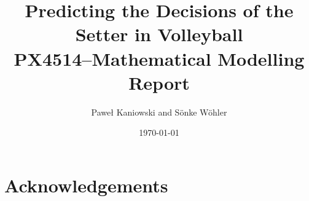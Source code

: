 \documentclass[11pt]{article}
\title{   Predicting the Decisions of the Setter in Volleyball \\
  \large PX4514--Mathematical Modelling Report
}
\author{Pawe{\l} Kaniowski and S\"onke W\"ohler}
\date{\today}
\begin{document}
  
  

  \clearpage
  
  \abstract
    \begingroup
      \fontsize{8pt}{10pt}\selectfont
    
        \lipsum[1]
    
    \endgroup
    \hrulefill
    
      
      
      
      
    
    \clearpage
    \section*{Acknowledgements}
    \nocite{*} %
    
  
\end{document}
